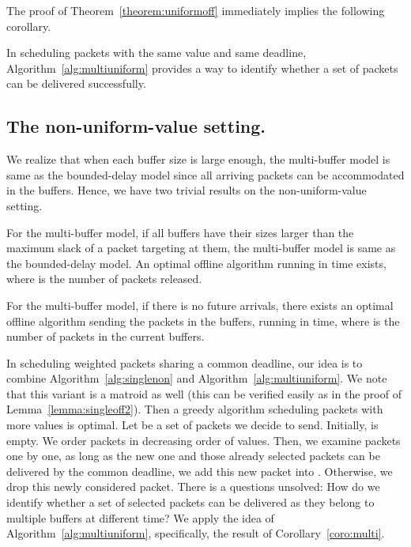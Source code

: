 \documentclass[final, 11pt]{article}
\begin{document}
The proof of Theorem~\ref{theorem:uniformoff} immediately implies the following corollary.

\begin{corollary}
In scheduling packets with the same value and same deadline, Algorithm~\ref{alg:multiuniform} provides a way to identify whether a set of packets can be delivered successfully.
\end{corollary}


\subsection{The non-uniform-value setting.}

We realize that when each buffer size is large enough, the multi-buffer model is same as the bounded-delay model since all arriving packets can be accommodated in the buffers. Hence, we have two trivial results on the non-uniform-value setting.

\begin{lemma}
For the multi-buffer model, if all buffers have their sizes larger than the maximum slack of a packet targeting at them, the multi-buffer model is same as the bounded-delay model. An optimal offline algorithm running in time  exists, where  is the number of packets released.
\end{lemma}

\begin{corollary}
For the multi-buffer model, if there is no future arrivals, there exists an optimal offline algorithm sending the packets in the buffers, running in  time, where  is the number of packets in the current buffers.
\label{coro:multi}
\end{corollary}

In scheduling weighted packets sharing a common deadline, our idea is to combine Algorithm~\ref{alg:singlenon} and Algorithm~\ref{alg:multiuniform}. We note that this variant is a matroid as well (this can be verified easily as in the proof of Lemma~\ref{lemma:singleoff2}). Then a greedy algorithm  scheduling packets with more values is optimal. Let  be a set of packets we decide to send. Initially,  is empty. We order packets in decreasing order of values. Then, we examine packets one by one, as long as the new one and those already selected packets can be delivered by the common deadline, we add this new packet into . Otherwise, we drop this newly considered packet. There is a questions unsolved: How do we identify whether a set of selected packets can be delivered as they belong to multiple buffers at different time? We apply the idea of Algorithm~\ref{alg:multiuniform}, specifically, the result of Corollary~\ref{coro:multi}.
\end{document}
